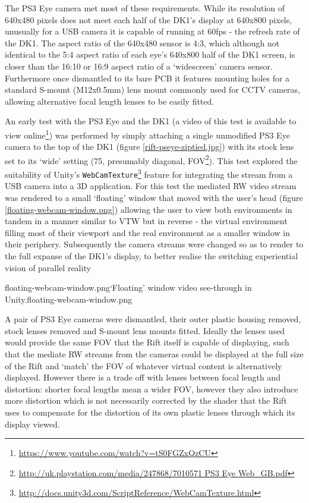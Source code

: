 The PS3 Eye camera met most of these requirements. While its resolution of 640x480 pixels does not meet each half of the DK1's display at 640x800 pixels, unusually for a USB camera it is capable of running at 60fps - the refresh rate of the DK1. The aspect ratio of the 640x480 sensor is 4:3, which although not identical to the 5:4 aspect ratio of each eye's 640x800 half of the DK1 screen, is closer than the 16:10 or 16:9 aspect ratio of a `widescreen' camera sensor. Furthermore once dismantled to its bare PCB it features mounting holes for a standard S-mount (M12x0.5mm) lens mount commonly used for CCTV cameras, allowing alternative focal length lenses to be easily fitted.

An early test with the PS3 Eye and the DK1 (a video of this test is available to view online\footnote{\url{https://www.youtube.com/watch?v=tS0FGZxQzCU}}) was performed by simply attaching a single unmodified PS3 Eye camera to the top of the DK1 (figure \ref{rift-pseye-ziptied.jpg}) with its stock lens set to its `wide' setting (75\textdegree, presumably diagonal, FOV\footnote{\url{http://uk.playstation.com/media/247868/7010571 PS3 Eye Web_GB.pdf}}). This test explored the suitability of Unity's \texttt{WebCamTexture}\footnote{\url{http://docs.unity3d.com/ScriptReference/WebCamTexture.html}} feature for integrating the stream from a USB camera into a 3D application. For this test the mediated RW video stream was rendered to a small `floating' window that moved with the user's head (figure \ref{floating-webcam-window.png}) allowing the user to view both environments in tandem in a manner similar to VTW but in reverse - the virtual environment filling most of their viewport and the real environment as a smaller window in their periphery. Subsequently the camera streams were changed so as to render to the full expanse of the DK1's display, to better realise the switching experiential vision of parallel reality

       {floating-webcam-window.png}{`Floating' window video see-through in Unity.}{floating-webcam-window.png}

A pair of PS3 Eye cameras were dismantled, their outer plastic housing removed, stock lenses removed and S-mount lens mounts fitted. Ideally the lenses used would provide the same FOV that the Rift itself is capable of displaying, such that the mediate RW streams from the cameras could be displayed at the full size of the Rift and `match' the FOV of whatever virtual content is alternatively displayed. However there is a trade off with lenses between focal length and distortion: shorter focal lengths mean a wider FOV, however they also introduce more distortion which is not necessarily corrected by the shader that the Rift uses to compensate for the distortion of its own plastic lenses through which its display viewed.

